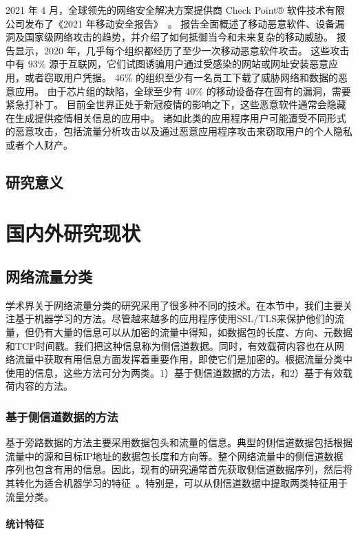 \documentclass[degree=master,cjk-font=noto]{thuthesis}
\begin{document}
2021 年 4 月，全球领先的网络安全解决方案提供商 Check Point® 软件技术有限公司发布了《2021 年移动安全报告》~\cite{Attack2-report}。
报告全面概述了移动恶意软件、设备漏洞及国家级网络攻击的趋势，并介绍了如何抵御当今和未来复杂的移动威胁。
报告显示，2020 年，几乎每个组织都经历了至少一次移动恶意软件攻击。
这些攻击中有 93\% 源于互联网，它们试图诱骗用户通过受感染的网站或网址安装恶意应用，或者窃取用户凭据。
46\% 的组织至少有一名员工下载了威胁网络和数据的恶意应用。
由于芯片组的缺陷，全球至少有 40\% 的移动设备存在固有的漏洞，需要紧急打补丁。
目前全世界正处于新冠疫情的影响之下，这些恶意软件通常会隐藏在生成提供疫情相关信息的应用中。
诸如此类的应用程序用户可能遭受不同形式的恶意攻击，包括流量分析攻击以及通过恶意应用程序攻击来窃取用户的个人隐私或者个人财产。

\section{研究意义}

\chapter{国内外研究现状}

\section{网络流量分类}

学术界关于网络流量分类的研究采用了很多种不同的技术。在本节中，我们主要关注基于机器学习的方法。尽管越来越多的应用程序使用SSL/TLS来保护他们的流量，但仍有大量的信息可以从加密的流量中得知，如数据包的长度、方向、元数据和TCP时间戳。我们把这种信息称为侧信道数据。同时，有效载荷内容也在从网络流量中获取有用信息方面发挥着重要作用，即使它们是加密的。根据流量分类中使用的信息，这些方法可分为两类。1）基于侧信道数据的方法，和2）基于有效载荷内容的方法。

\subsection{基于侧信道数据的方法}


基于旁路数据的方法主要采用数据包头和流量的信息。典型的侧信道数据包括根据流量中的源和目标IP地址的数据包长度和方向等。整个网络流量中的侧信道数据序列也包含有用的信息。因此，现有的研究通常首先获取侧信道数据序列，然后将其转化为适合机器学习的特征~\cite{app_class}。特别是，可以从侧信道数据中提取两类特征用于流量分类。

\subsubsection{统计特征}
\end{document}
